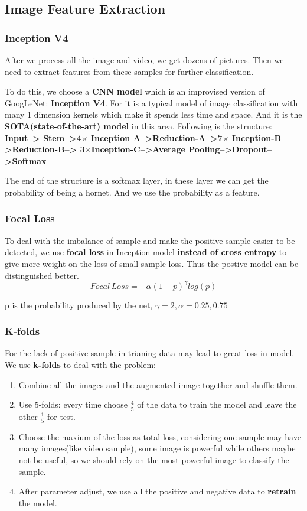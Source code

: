 \documentclass[12pt]{article}
\begin{document}
\subsection{Image Feature Extraction}
\subsubsection{Inception V4}
After we process all the image and video, we get dozens of pictures. Then we need to extract features from these samples for further classification.

To do this, we choose a \textbf{CNN model} which is an improvised version of GoogLeNet: \textbf{Inception V4}\cite{inception}. For it is a typical model of image classification with many 1 dimension kernels which make it spends less time and space. And it is the \textbf{SOTA(state-of-the-art) model} in this area.
Following is the structure:\\
\textbf{Input--> Stem-->4$\times$ Inception A-->Reduction-A-->7$\times$ Inception-B-->Reduction-B--> 3$\times$Inception-C-->Average Pooling-->Dropout-->Softmax}

The end of the structure is a softmax layer, in these layer we can get the probability of being a hornet. And we use the probability as a feature.


\subsubsection{Focal Loss}
To deal with the imbalance of sample and make the positive sample easier to be detected, we use \textbf{focal loss}\cite{focal} in Inception model \textbf{instead of cross entropy} to give more weight on the loss of small sample loss. Thus the postive model can be distinguished better.	
\begin{equation}
Focal\,Loss=-\alpha(1-p)^\gamma log(p)
\end{equation} 
\begin{center}
	p is the probability produced by the net, $\gamma=2,\alpha=0.25,0.75$
\end{center}

\subsubsection{K-folds}
For the lack of positive sample in trianing data may lead to great loss in model. We use \textbf{k-folds} to deal with the problem:
\begin{enumerate}
	\item Combine all the images and the augmented image together and shuffle them.
	\item Use 5-folds: every time choose $\frac{4}{5}$ of the data to train the model and leave the other $\frac{1}{5}$ for test.
	\item Choose the maxium of the loss as total loss, considering one sample may have many images(like video sample), some image is powerful while others maybe not be useful, so we should rely on the most powerful image to classify the sample.
	\item After parameter adjust, we use all the positive and negative data to\textbf{ retrain} the model.
\end{enumerate}
\end{document}
